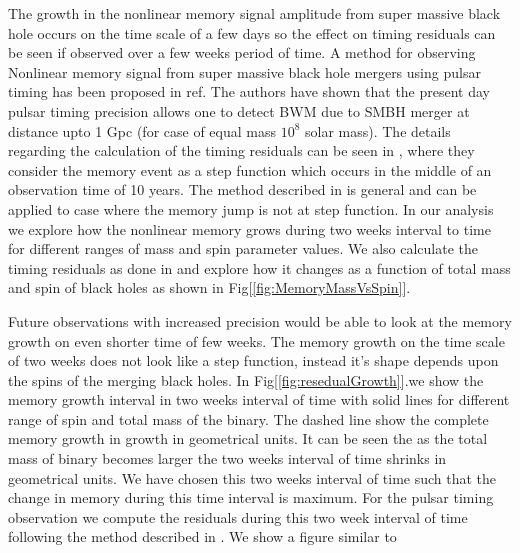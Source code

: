 \documentclass[twocolumn,showpacs,aps,prd,nobibnotes,floatfix]{revtex4-1}
\begin{document}
The growth in the nonlinear memory signal amplitude from super massive black hole occurs on the time scale of a few days so the effect on timing residuals can be seen if observed over a few weeks period of time. A method for observing Nonlinear memory signal from super massive black hole mergers using pulsar timing has been proposed in ref\cite{Pshirkov2010}. The authors have shown that the present day pulsar timing precision allows one to detect BWM due to  SMBH merger at distance upto 1 Gpc (for case of equal mass $10^{8}$ solar mass). The details regarding the calculation of the timing residuals can be seen in \cite{Pshirkov2010}, where they consider the memory event as a step function which occurs in the middle of an observation time of 10 years. The method described in \cite{Pshirkov2010} is general and can be applied to case where the memory jump is not at step function. In our analysis we explore how the nonlinear memory grows during two weeks interval to time for different ranges of mass and spin parameter values. We also calculate the timing residuals as done in \cite{Pshirkov2010} and explore how it changes as a function of total mass and spin of black holes as shown in Fig[\ref{fig:MemoryMassVsSpin}].
\par 
Future observations with increased precision would be able to look at the memory growth on even shorter time of few weeks. The memory growth on the time scale of two weeks does not look like a step function, instead it's shape depends upon the spins of the merging black holes. In Fig[\ref{fig:resedualGrowth}].we show the memory growth interval in two weeks interval of time with solid lines for different range of spin and total mass of the binary. The dashed line show the complete memory growth in growth in geometrical units. It can be seen the as the total mass of binary becomes larger the two weeks interval of time shrinks in geometrical units. We have chosen this two weeks interval of time such that the change in memory during this time interval is maximum. For the pulsar timing observation we compute the residuals during this two week interval of time following the method described in \cite{Pshirkov2010}. We show a figure similar to
\end{document}
